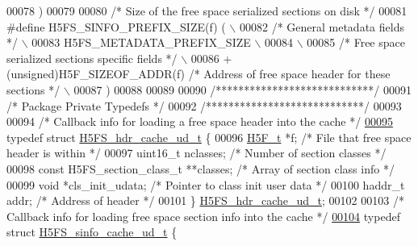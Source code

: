 \begin{DoxyCode}
00078 \textcolor{preprocessor}{    )}
00079 
00080 \textcolor{comment}{/* Size of the free space serialized sections on disk */}
00081 \textcolor{preprocessor}{#define H5FS\_SINFO\_PREFIX\_SIZE(f) (                                           \(\backslash\)}
00082 \textcolor{preprocessor}{    }\textcolor{comment}{/* General metadata fields */}\textcolor{preprocessor}{                                             \(\backslash\)}
00083 \textcolor{preprocessor}{    H5FS\_METADATA\_PREFIX\_SIZE                                                 \(\backslash\)}
00084 \textcolor{preprocessor}{                                                                              \(\backslash\)}
00085 \textcolor{preprocessor}{    }\textcolor{comment}{/* Free space serialized sections specific fields */}\textcolor{preprocessor}{                      \(\backslash\)}
00086 \textcolor{preprocessor}{    + (unsigned)H5F\_SIZEOF\_ADDR(f) }\textcolor{comment}{/* Address of free space header for these sections */}\textcolor{preprocessor}{ \(\backslash\)}
00087 \textcolor{preprocessor}{    )}
00088 
00089 
00090 \textcolor{comment}{/****************************/}
00091 \textcolor{comment}{/* Package Private Typedefs */}
00092 \textcolor{comment}{/****************************/}
00093 
00094 \textcolor{comment}{/* Callback info for loading a free space header into the cache */}
\hyperlink{struct_h5_f_s__hdr__cache__ud__t}{00095} \textcolor{keyword}{typedef} \textcolor{keyword}{struct }\hyperlink{struct_h5_f_s__hdr__cache__ud__t}{H5FS\_hdr\_cache\_ud\_t} \{
00096     \hyperlink{struct_h5_f__t}{H5F\_t} *f;                  \textcolor{comment}{/* File that free space header is within */}
00097     uint16\_t nclasses;                            \textcolor{comment}{/* Number of section classes */}
00098     \textcolor{keyword}{const} H5FS\_section\_class\_t **classes;       \textcolor{comment}{/* Array of section class info */}
00099     \textcolor{keywordtype}{void} *cls\_init\_udata;                       \textcolor{comment}{/* Pointer to class init user data */}
00100     haddr\_t addr;              \textcolor{comment}{/* Address of header */}
00101 \} \hyperlink{struct_h5_f_s__hdr__cache__ud__t}{H5FS\_hdr\_cache\_ud\_t};
00102 
00103 \textcolor{comment}{/* Callback info for loading free space section info into the cache */}
\hyperlink{struct_h5_f_s__sinfo__cache__ud__t}{00104} \textcolor{keyword}{typedef} \textcolor{keyword}{struct }\hyperlink{struct_h5_f_s__sinfo__cache__ud__t}{H5FS\_sinfo\_cache\_ud\_t} \{

\end{DoxyCode}
